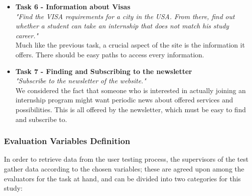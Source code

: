 \documentclass[11pt]{article} %
\begin{document}
\begin{itemize}
    \item \textbf{Task 6 - Information about Visas} \\
    \textit{"Find the VISA requirements for a city in the USA. From there, find out whether a student can take an internship that does not match his study career."}\\
    Much like the previous task, a crucial aspect of the site is the information it offers. There should be easy paths to access every information.
    \item \textbf{Task 7 - Finding and Subscribing to the newsletter} \\ 
    \textit{"Subscribe to the newsletter of the website."}\\
    We considered the fact that someone who is interested in actually joining an internship program might want periodic news about offered services and possibilities. This is all offered by the newsletter, which must be easy to find and subscribe to. 
\end{itemize}

\subsubsection{Evaluation Variables Definition}
In order to retrieve data from the user testing process, the supervisors of the test gather data according to the chosen variables; these are agreed upon among the evaluators for the task at hand, and can be divided into two categories for this study:
\end{document}

